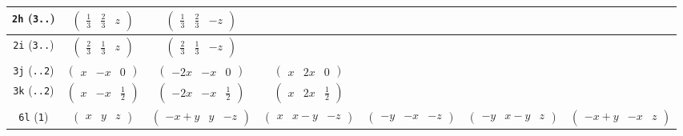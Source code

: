 \documentclass[fleqn,9pt,landscape]{jsarticle}
\begin{document}
\begin{center}
\begin{longtable}{ccccccc}
{\tt 2h} ({\tt 3..}) & $ \begin{pmatrix} \frac{1}{3} & \frac{2}{3} & z \end{pmatrix} $ & $ \begin{pmatrix} \frac{1}{3} & \frac{2}{3} & - z \end{pmatrix} $ & $  $ & $  $ & $  $ & $  $ \\ \hline
{\tt 2i} ({\tt 3..}) & $ \begin{pmatrix} \frac{2}{3} & \frac{1}{3} & z \end{pmatrix} $ & $ \begin{pmatrix} \frac{2}{3} & \frac{1}{3} & - z \end{pmatrix} $ & $  $ & $  $ & $  $ & $  $ \\ \hline
{\tt 3j} ({\tt ..2}) & $ \begin{pmatrix} x & - x & 0 \end{pmatrix} $ & $ \begin{pmatrix} - 2 x & - x & 0 \end{pmatrix} $ & $ \begin{pmatrix} x & 2 x & 0 \end{pmatrix} $ & $  $ & $  $ & $  $ \\ \hline
{\tt 3k} ({\tt ..2}) & $ \begin{pmatrix} x & - x & \frac{1}{2} \end{pmatrix} $ & $ \begin{pmatrix} - 2 x & - x & \frac{1}{2} \end{pmatrix} $ & $ \begin{pmatrix} x & 2 x & \frac{1}{2} \end{pmatrix} $ & $  $ & $  $ & $  $ \\ \hline
{\tt 6l} ({\tt 1}) & $ \begin{pmatrix} x & y & z \end{pmatrix} $ & $ \begin{pmatrix} - x + y & y & - z \end{pmatrix} $ & $ \begin{pmatrix} x & x - y & - z \end{pmatrix} $ & $ \begin{pmatrix} - y & - x & - z \end{pmatrix} $ & $ \begin{pmatrix} - y & x - y & z \end{pmatrix} $ & $ \begin{pmatrix} - x + y & - x & z \end{pmatrix} $ \\
\end{longtable}
\end{center}
\end{document}
